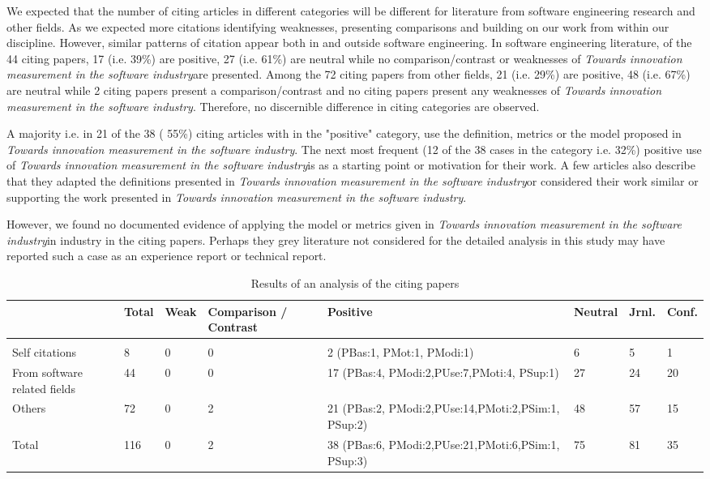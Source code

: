 \documentclass[sigplan]{acmart}
\newcommand{\theArticle}{\textit{Towards innovation measurement in the software industry}}
\begin{document}
We expected that the number of citing articles in different categories will be different for literature from software engineering research and other fields. As we expected more citations identifying weaknesses, presenting comparisons and building on our work from within our discipline. However, similar patterns of citation appear both in and outside software engineering. In software engineering literature, of the 44 citing papers, 17 (i.e. 39\%) are positive, 27 (i.e. 61\%) are neutral while no comparison/contrast or weaknesses of \theArticle are presented. Among the 72 citing papers from other fields, 21 (i.e. 29\%) are positive, 48 (i.e. 67\%) are neutral while 2 citing papers present a comparison/contrast and no citing papers present any weaknesses of \theArticle. Therefore, no discernible difference in citing categories are observed. 

A majority i.e. in 21 of the 38 ( 55\%) citing articles with in the "positive" category, use the definition, metrics or the model proposed in \theArticle. The next most frequent (12 of the 38 cases in the category i.e. 32\%) positive use of \theArticle is as a starting point or motivation for their work. A few articles also describe that they adapted the definitions presented in \theArticle or considered their work similar or supporting the work presented in \theArticle. 

However, we found no documented evidence of applying the model or metrics given in \theArticle in industry in the citing papers. Perhaps they grey literature not considered for the detailed analysis in this study may have reported such a case as an experience report or technical report.



\begin{table}
	\caption{Results of an analysis of the citing papers}
	\label{tab:CitationAnalysis}
	\begin{tabular}{p{2.5cm}llp{1.5cm}llll}
			\toprule
		& Total & Weak & Comparison / Contrast & Positive                                            & Neutral & Jrnl. & Conf. \\
		\midrule
		&       &      &                       &                                                     &         &         &            \\
		Self citations               & 8     & 0    & 0                     & 2 (PBas:1, PMot:1, PModi:1)                         & 6       & 5       & 1          \\
		From software related fields & 44    & 0    & 0                     & 17 (PBas:4, PModi:2,PUse:7,PMoti:4, PSup:1)         & 27      & 24      & 20         \\
		Others                       & 72    & 0    & 2                     & 21 (PBas:2, PModi:2,PUse:14,PMoti:2,PSim:1, PSup:2) & 48      & 57      & 15         \\
		Total                        & 116   & 0    & 2                     & 38 (PBas:6, PModi:2,PUse:21,PMoti:6,PSim:1, PSup:3) & 75      & 81      & 35        \\ \bottomrule
	\end{tabular}
\end{table}
\end{document}

